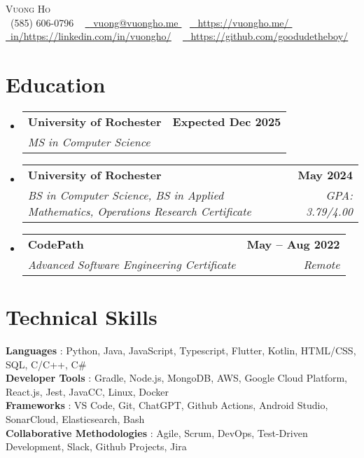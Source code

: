 \documentclass[letterpaper,11pt]{article}
\makeatletter
\newcommand{\resumeSubheading}[4]{
  \vspace{-2pt}\item
    \begin{tabular*}{1.0\textwidth}[t]{l@{\extracolsep{\fill}}r}
      \textbf{#1} & \textbf{\small #2} \\
      \textit{\small#3} & \textit{\small #4} \\
    \end{tabular*}\vspace{-7pt}
}
\newcommand{\resumeSubHeadingListStart}{\begin{itemize}[leftmargin=0.0in, label={}]}
\newcommand{\resumeSubHeadingListEnd}{\end{itemize}}
\makeatother
\begin{document}
\begin{center}
  {\Huge \scshape Vuong Ho} \\ \vspace{1pt}
  \small \raisebox{-0.1\height}
  \faPhone\ (585) 606-0796
  ~ \href{mailto:vuong@vuongho.me}{\raisebox{-0.2\height} \faEnvelope\ \underline{ vuong@vuongho.me }}
  ~ \href{https://https://vuongho.me/}{\raisebox{-0.2\height} \faHome\ \underline{ https://vuongho.me/ }}
  ~ \href{https://linkedin.com/in/https://linkedin.com/in/vuongho/}{\raisebox{-0.2\height} \faLinkedin\ \underline{in/https://linkedin.com/in/vuongho/}}
  ~ \href{https://github.com/https://github.com/goodudetheboy/}{\raisebox{-0.2\height} \faGithub\ \underline{ https://github.com/goodudetheboy/ }}
  \vspace{-8pt}
\end{center}


\section{Education}
  \resumeSubHeadingListStart
  
    \resumeSubheading
      { University of Rochester }{ Expected Dec 2025 }
      { MS in Computer Science } {  }
  
    \resumeSubheading
      { University of Rochester }{ May 2024 }
      { BS in Computer Science, BS in Applied Mathematics, Operations Research Certificate } { GPA: 3.79/4.00 }
  
    \resumeSubheading
      { CodePath }{ May – Aug 2022 }
      { Advanced Software Engineering Certificate } { Remote }
  
  \resumeSubHeadingListEnd

\section{Technical Skills}
 \begin{itemize}[leftmargin=0.15in, label={}]
    \small{\item{
      
        \textbf{ Languages }{: Python, Java, JavaScript, Typescript, Flutter, Kotlin, HTML/CSS, SQL, C/C++, C\#} \\
      
        \textbf{ Developer Tools }{: Gradle, Node.js, MongoDB, AWS, Google Cloud Platform, React.js, Jest, JavaCC, Linux, Docker} \\
      
        \textbf{ Frameworks }{: VS Code, Git, ChatGPT, Github Actions, Android Studio, SonarCloud, Elasticsearch, Bash} \\
      
        \textbf{ Collaborative Methodologies }{: Agile, Scrum, DevOps, Test-Driven Development, Slack, Github Projects, Jira} \\
      
    }}
 \end{itemize}
 \vspace{-16pt}
\end{document}
